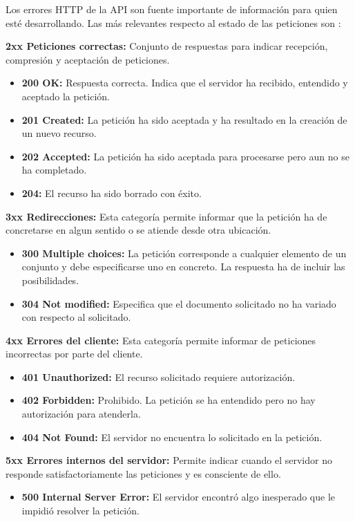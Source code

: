 Los errores HTTP de la API son fuente importante de información para quien esté desarrollando. Las más relevantes respecto al estado de las peticiones son \parencite{aporta2019}:

\begin{description}
\item \textbf{2xx Peticiones correctas:} Conjunto de respuestas para indicar recepción, compresión y aceptación de peticiones.
\begin{itemize}
\item \textbf{200 OK:} Respuesta correcta. Indica que el servidor ha recibido, entendido y aceptado la petición.
\item \textbf{201 Created:} La petición ha sido aceptada y ha resultado en la creación de un nuevo recurso.
\item \textbf{202 Accepted:} La petición ha sido aceptada para procesarse pero aun no se ha completado.
\item \textbf{204:} El recurso ha sido borrado con éxito.
\end{itemize}
\item \textbf{3xx Redirecciones:} Esta categoría permite informar que la petición ha de concretarse en algun sentido o se atiende desde otra ubicación.
\begin{itemize}
\item \textbf{300 Multiple choices:} La petición corresponde a cualquier elemento de un conjunto y debe especificarse uno en concreto. La respuesta ha de incluir las posibilidades.
\item \textbf{304 Not modified:} Especifica que el documento solicitado no ha variado con respecto al solicitado.
\end{itemize}
\item \textbf{4xx Errores del cliente:} Esta categoría permite informar de peticiones incorrectas por parte del cliente.
\begin{itemize}
\item \textbf{401 Unauthorized:} El recurso solicitado requiere autorización.
\item \textbf{402 Forbidden:} Prohibido. La petición se ha entendido pero no hay autorización para atenderla.
\item \textbf{404 Not Found:} El servidor no encuentra lo solicitado en la petición.
\end{itemize}
\item \textbf{5xx Errores internos del servidor:} Permite indicar cuando el servidor no responde satisfactoriamente las peticiones y es consciente de ello.
\begin{itemize}
\item \textbf{500 Internal Server Error:} El servidor encontró algo inesperado que le impidió resolver la petición.
\end{itemize}
\end{description}


